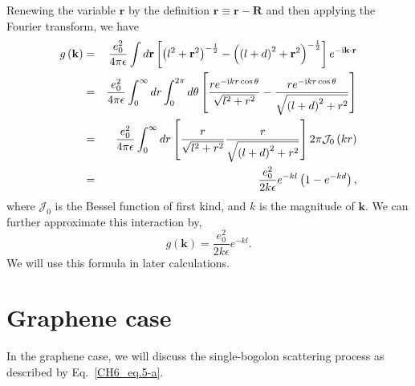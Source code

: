 Renewing the variable $\mathbf{r}$ by the definition $\mathbf{r} \equiv \mathbf{r} - \mathbf{R}$ and then applying the Fourier transform, we have
\begin{eqnarray}
 g\left( \mathbf{k} \right) &=& \frac{e_0^2}{4\pi \epsilon} \int d\mathbf{r} \left[ \left( l^2 + \mathbf{r}^2 \right)^{-\frac{1}{2}} -\left( \left( l+d \right)^2 + \mathbf{r}^2 \right)^{-\frac{1}{2}} \right] e^{-\mathrm{i} \mathbf{k} \cdot \mathbf{r}} \\ \nonumber
 &=& \frac{e_0^2}{4 \pi \epsilon} \int_0^\infty dr \int_0^{2\pi} d\theta \left[ \frac{re^{-\mathrm{i} k r \cos\theta}}{\sqrt{l^2 + r^2}} - \frac{re^{-\mathrm{i} k r \cos\theta}}{\sqrt{\left( l + d \right)^2 +r^2 }} \right] \\ \nonumber
 &=& \frac{e_0^2}{4 \pi \epsilon} \int_0^\infty dr \left[ \frac{r}{\sqrt{l^2 + r^2}} \frac{r}{\sqrt{\left( l+d \right)^2 + r^2}}\right] 2\pi \mathcal{J}_0\left( k r \right) \\ \nonumber
 &=& \frac{e_0^2}{2 k \epsilon } e^{-kl} \left( 1 - e^{-kd} \right),
\end{eqnarray}
where $\mathcal{J}_0$ is the Bessel function of first kind, and $k$ is the magnitude of $\mathbf{k}$.
We can further approximate this interaction by,
\begin{equation}
    g\left(\mathbf{k}\right) = \frac{e_0^2}{2k \epsilon}e^{-kl}.
    \label{eq:CH6_gk_k}
\end{equation}
We will use this formula in later calculations.
%
%
%
\section{Graphene case}
In the graphene case, we will discuss the single-bogolon scattering process as described by Eq.~\eqref{CH6_eq.5-a}.
